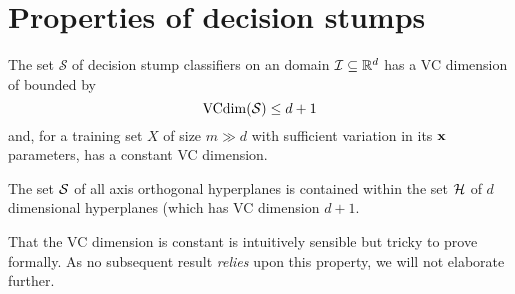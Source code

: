 \section{Properties of decision stumps}

\begin{theorem}
\label{theorem:vcdim stumps}
The set $\mathcal{S}$ of decision stump classifiers on an domain
$\mathcal{I} \subseteq \mathbb{R}^d$ has a VC dimension of bounded by 
%
\begin{equation}
\mathrm{VCdim}(\mathcal{S}) \leq d + 1
\end{equation}
%
and, for a training set $X$ of size $m \gg d$ with sufficient
variation in its $\mathbf{x}$ parameters, has a constant VC dimension.
%
\end{theorem}

\proof The set $\mathcal{S}$ of all axis orthogonal hyperplanes
is contained within the set $\mathcal{H}$ of $d$ dimensional hyperplanes
(which has VC dimension $d+1$.

That the VC dimension is constant is intuitively sensible
but tricky to prove formally.  As no subsequent result \emph{relies}
upon this property, we will not elaborate further.




